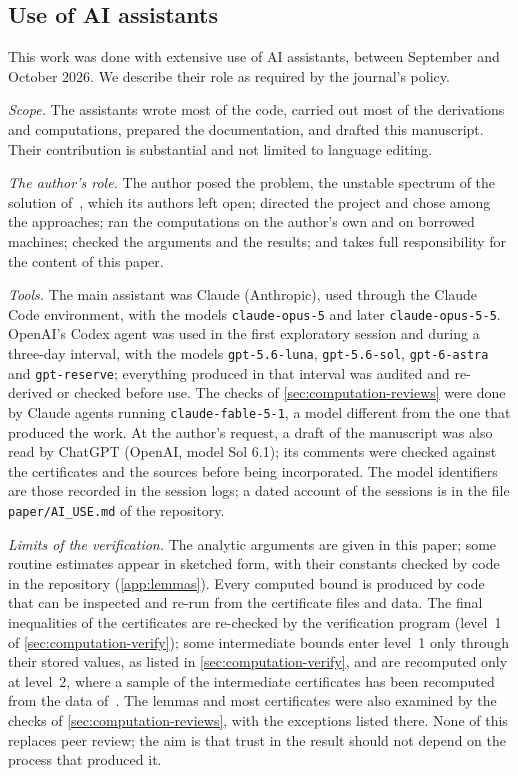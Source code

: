\subsection{Use of AI assistants}\label{sec:computation-ai}

This work was done with extensive use of AI assistants, between September and October 2026. We describe their role
as required by the journal's policy.

\emph{Scope.} The assistants wrote most of the code, carried out most of the derivations and computations, prepared
the documentation, and drafted this manuscript. Their contribution is substantial and not limited to language
editing.

\emph{The author's role.} The author posed the problem, the unstable spectrum of the solution of~\cite{RT2019}, which
its authors left open; directed the project and chose among the approaches; ran the computations on the author's own
and on borrowed machines; checked the arguments and the results; and takes full responsibility for the content of
this paper.

\emph{Tools.} The main assistant was Claude (Anthropic), used through the Claude Code environment, with the models
\texttt{claude-opus-5} and later \texttt{claude-opus-5-5}. OpenAI's Codex agent was used in the first exploratory
session and during a three-day interval, with the models \texttt{gpt-5.6-luna}, \texttt{gpt-5.6-sol},
\texttt{gpt-6-astra} and \texttt{gpt-reserve}; everything produced in that interval was audited and re-derived or
checked before use. The checks of \cref{sec:computation-reviews} were done by Claude agents running
\texttt{claude-fable-5-1}, a model different from the one that produced the work. At the author's request, a draft of the
manuscript was also read by ChatGPT (OpenAI, model Sol 6.1); its comments were checked against the certificates and
the sources before being incorporated. The model identifiers are those recorded in the session logs; a dated account of the sessions is in the file \texttt{paper/AI\_USE.md} of the
repository.

\emph{Limits of the verification.} The analytic arguments are given in this paper; some routine estimates appear in
sketched form, with their constants checked by code in the repository (\cref{app:lemmas}). Every computed bound is
produced by code that can be inspected and re-run from the certificate files and data. The final inequalities of the
certificates are re-checked by the verification program (level~1 of \cref{sec:computation-verify}); some intermediate
bounds enter level~1 only through their stored values, as listed in \cref{sec:computation-verify}, and are recomputed
only at level~2, where a sample of the intermediate certificates has been recomputed from the data
of~\cite{RT2019}. The lemmas and most certificates were also
examined by the checks of \cref{sec:computation-reviews}, with the exceptions listed there. None of this replaces
peer review; the aim is that trust in the result should not depend on the process that produced it.

